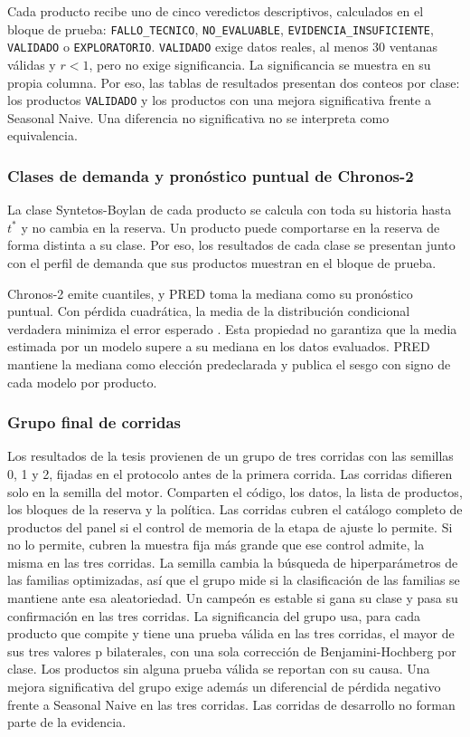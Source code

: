 Cada producto recibe uno de cinco veredictos descriptivos, calculados en el bloque de prueba: \texttt{FALLO\_TECNICO}, \texttt{NO\_EVALUABLE}, \texttt{EVIDENCIA\_INSUFICIENTE}, \texttt{VALIDADO} o \texttt{EXPLORATORIO}. \texttt{VALIDADO} exige datos reales, al menos 30 ventanas válidas y $r < 1$, pero no exige significancia. La significancia se muestra en su propia columna. Por eso, las tablas de resultados presentan dos conteos por clase: los productos \texttt{VALIDADO} y los productos con una mejora significativa frente a Seasonal Naive. Una diferencia no significativa no se interpreta como equivalencia.

\subsubsection{Clases de demanda y pronóstico puntual de Chronos-2}
La clase Syntetos-Boylan de cada producto se calcula con toda su historia hasta $t^*$ y no cambia en la reserva. Un producto puede comportarse en la reserva de forma distinta a su clase. Por eso, los resultados de cada clase se presentan junto con el perfil de demanda que sus productos muestran en el bloque de prueba.

Chronos-2 emite cuantiles, y PRED toma la mediana como su pronóstico puntual. Con pérdida cuadrática, la media de la distribución condicional verdadera minimiza el error esperado \cite{gneiting2011}. Esta propiedad no garantiza que la media estimada por un modelo supere a su mediana en los datos evaluados. PRED mantiene la mediana como elección predeclarada y publica el sesgo con signo de cada modelo por producto.

\subsubsection{Grupo final de corridas}
Los resultados de la tesis provienen de un grupo de tres corridas con las semillas 0, 1 y 2, fijadas en el protocolo antes de la primera corrida. Las corridas difieren solo en la semilla del motor. Comparten el código, los datos, la lista de productos, los bloques de la reserva y la política. Las corridas cubren el catálogo completo de productos del panel si el control de memoria de la etapa de ajuste lo permite. Si no lo permite, cubren la muestra fija más grande que ese control admite, la misma en las tres corridas. La semilla cambia la búsqueda de hiperparámetros de las familias optimizadas, así que el grupo mide si la clasificación de las familias se mantiene ante esa aleatoriedad. Un campeón es estable si gana su clase y pasa su confirmación en las tres corridas. La significancia del grupo usa, para cada producto que compite y tiene una prueba válida en las tres corridas, el mayor de sus tres valores p bilaterales, con una sola corrección de Benjamini-Hochberg por clase. Los productos sin alguna prueba válida se reportan con su causa. Una mejora significativa del grupo exige además un diferencial de pérdida negativo frente a Seasonal Naive en las tres corridas. Las corridas de desarrollo no forman parte de la evidencia.
